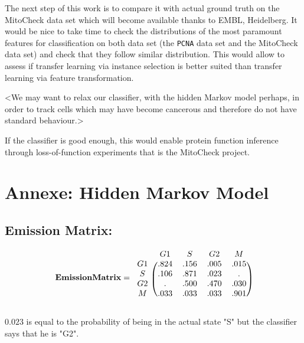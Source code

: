 \documentclass{article}
\begin{document}
\bigskip

The next step of this work is to compare it with actual ground truth on the MitoCheck data set which will become available thanks to EMBL, Heidelberg. It would be nice to take time to check the distributions of the most paramount features for classification on both data set (the \texttt{PCNA} data set and the MitoCheck data set) and check that they follow similar distribution. This would allow to assess if transfer learning via instance selection is better suited than transfer learning via feature transformation. 

<We may want to relax our classifier, with the hidden Markov model perhaps, in order to track cells which may have become cancerous and therefore do not have standard behaviour.> 

If the classifier is good enough, this would enable protein function inference through loss-of-function experiments that is the MitoCheck project.

\clearpage

\section{Annexe: Hidden Markov Model}
\subsection{Emission Matrix:}

\[
  \mathbf{Emission Matrix} = 
    \begin{blockarray}{ccccc}
        & G1 & S & G2 & M\\
      \begin{block}{c(cccc)}
        G1 & .824 & .156 & .005 & .015\\
        S  & .106 & .871 & .023 & .   \\
        G2 & .    & .500 & .470 & .030\\
        M  & .033 & .033 & .033 & .901\\
      \end{block}
    \end{blockarray}
\]

$0.023$ is equal to the probability of being in the actual state "S" but the classifier says that he is "G2".
\end{document}
